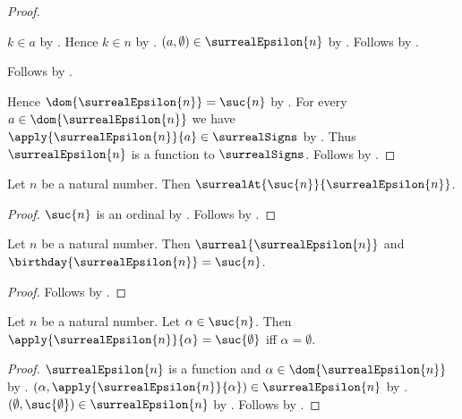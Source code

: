\begin{proof}
\begin{subproof}
\begin{subproof}
\begin{byCase}
                    $k\in a$ by .
                    Hence $k\in n$
                        by .
                    $(a,\emptyset)\in\surrealEpsilon{n}$
                        by .
                    Follows by .
            \end{byCase}
        \end{subproof}
        Follows by .
    \end{subproof}
    Hence $\dom{\surrealEpsilon{n}}=\suc{n}$
        by .
    For every $a\in\dom{\surrealEpsilon{n}}$ we have
        $\apply{\surrealEpsilon{n}}{a}\in\surrealSigns$
        by .
    Thus $\surrealEpsilon{n}$ is a function to $\surrealSigns$.
    Follows by .
\end{proof}

\begin{proposition}\label{surreal_epsilon_at}
    Let $n$ be a natural number.
    Then $\surrealAt{\suc{n}}{\surrealEpsilon{n}}$.
\end{proposition}
\begin{proof}
    $\suc{n}$ is an ordinal
        by .
    Follows by .
\end{proof}

\begin{corollary}\label{surreal_epsilon_is_surreal}
    Let $n$ be a natural number.
    Then $\surreal{\surrealEpsilon{n}}$ and
        $\birthday{\surrealEpsilon{n}}=\suc{n}$.
\end{corollary}
\begin{proof}
    Follows by .
\end{proof}

\begin{proposition}\label{surreal_epsilon_positive_value}
    Let $n$ be a natural number.
    Let $\alpha\in\suc{n}$.
    Then $\apply{\surrealEpsilon{n}}{\alpha}=\suc{\emptyset}$ iff
        $\alpha=\emptyset$.
\end{proposition}
\begin{proof}
    $\surrealEpsilon{n}$ is a function and
        $\alpha\in\dom{\surrealEpsilon{n}}$
        by .
    $(\alpha,\apply{\surrealEpsilon{n}}{\alpha})
        \in\surrealEpsilon{n}$
        by .
    $(\emptyset,\suc{\emptyset})\in\surrealEpsilon{n}$
        by .
    Follows by .
\end{proof}

